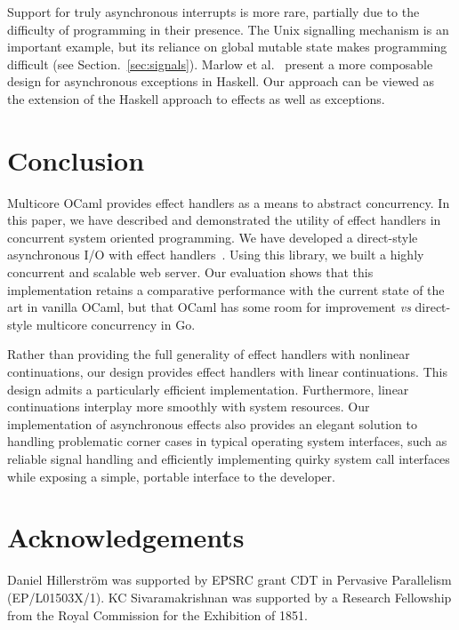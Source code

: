 \documentclass{llncs}
\begin{document}
Support for truly asynchronous interrupts is more rare, partially due to the
difficulty of programming in their presence. The Unix signalling mechanism is
an important example, but its reliance on global mutable state makes
programming difficult (see Section.~\ref{sec:signals}). Marlow et
al.~\citep*{Marlow2001async} present a more composable design for asynchronous
exceptions in Haskell. Our approach
can be viewed as the extension of the Haskell approach to effects as well as
exceptions.


\section{Conclusion}
\label{sec:conclusions}

Multicore OCaml provides effect handlers as a means to abstract concurrency. In
this paper, we have described and demonstrated the utility of effect handlers
in concurrent system oriented programming. We have developed a direct-style
asynchronous I/O with effect handlers~\citep*{aeio}. Using this library, we
built a highly concurrent and scalable web server. Our evaluation shows that
this implementation retains a comparative performance with the current state of
the art in vanilla OCaml, but that OCaml has some room for improvement {\em vs}
direct-style multicore concurrency in Go.

Rather than providing the full generality of effect handlers with nonlinear
continuations, our design provides effect handlers with linear continuations.
This design admits a particularly efficient implementation. Furthermore, linear
continuations interplay more smoothly with system resources. Our implementation
of asynchronous effects also provides an elegant solution to handling
problematic corner cases in typical operating system interfaces, such as
reliable signal handling and efficiently implementing quirky system call
interfaces while exposing a simple, portable interface to the developer.

\section*{Acknowledgements}
Daniel Hillerström was supported by EPSRC grant CDT in Pervasive
Parallelism (EP/L01503X/1).  KC Sivaramakrishnan was supported by a
Research Fellowship from the Royal Commission for the Exhibition of
1851.

\end{document}
